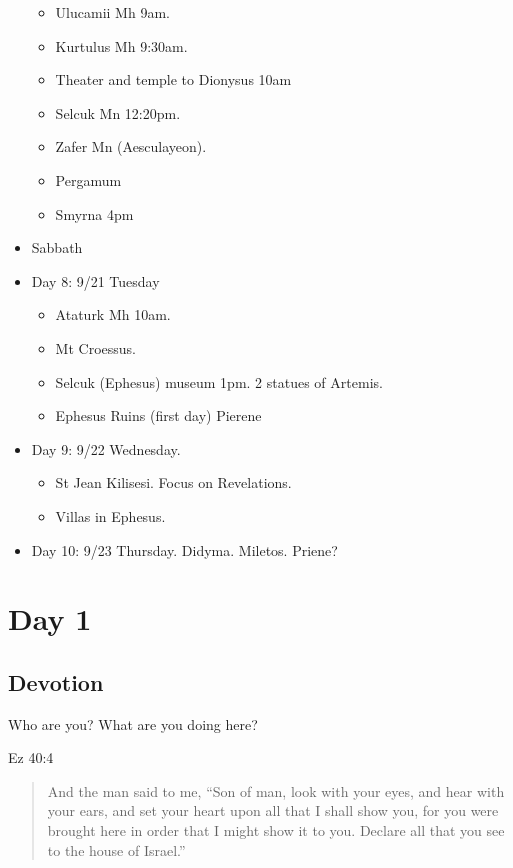 \documentclass[
]{book}
\providecommand{\tightlist}{%
  \setlength{\itemsep}{0pt}\setlength{\parskip}{0pt}}
\begin{document}
\begin{itemize}
  \begin{itemize}
  \tightlist
  \item
    Ulucamii Mh 9am.
  \item
    Kurtulus Mh 9:30am.
  \item
    Theater and temple to Dionysus 10am
  \item
    Selcuk Mn 12:20pm.
  \item
    Zafer Mn (Aesculayeon).
  \item
    Pergamum
  \item
    Smyrna 4pm
  \end{itemize}
\item
  Sabbath
\item
  Day 8: 9/21 Tuesday

  \begin{itemize}
  \tightlist
  \item
    Ataturk Mh 10am.\\
  \item
    Mt Croessus.
  \item
    Selcuk (Ephesus) museum 1pm. 2 statues of Artemis.
  \item
    Ephesus Ruins (first day) Pierene
  \end{itemize}
\item
  Day 9: 9/22 Wednesday.

  \begin{itemize}
  \tightlist
  \item
    St Jean Kilisesi. Focus on Revelations.
  \item
    Villas in Ephesus.
  \end{itemize}
\item
  Day 10: 9/23 Thursday. Didyma. Miletos. Priene?
\end{itemize}

\hypertarget{day-1}{%
\chapter{Day 1}\label{day-1}}

\hypertarget{devotion}{%
\section{Devotion}\label{devotion}}

Who are you? What are you doing here?

Ez 40:4

\begin{quote}
And the man said to me, ``Son of man, look with your eyes, and hear with your ears, and set your heart upon all that I shall show you, for you were brought here in order that I might show it to you. Declare all that you see to the house of Israel.''
\end{quote}
\end{document}
